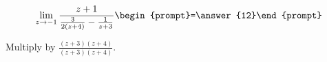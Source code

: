 \documentclass{ximera}
\author{Bart Snapp}
\begin{document}
\begin{exercise}

\[
\lim_{z\to -1 } \frac{z+1}{\frac{3}{2 (z+4)}-\frac{1}{z+3}}  \begin{prompt}=\answer{12}\end{prompt}
\]
\begin{hint}
Multiply by $\frac{(z+3) (z+4)}{(z+3) (z+4)}$.
\end{hint}
\end{exercise}
\end{document}
